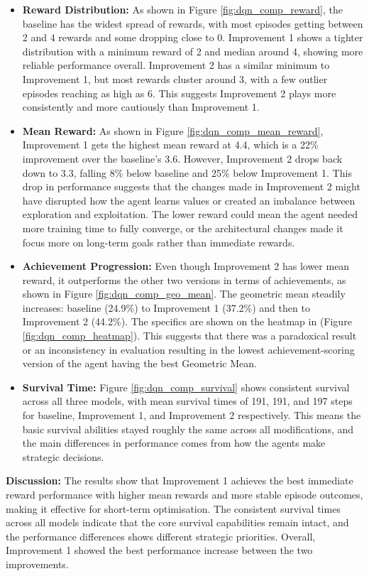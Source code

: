 \documentclass[twocolumn]{article}
\begin{document}
\begin{itemize}
	\item \textbf{Reward Distribution:} As shown in Figure \ref{fig:dqn_comp_reward}, the baseline has the widest spread of rewards, with most episodes getting between 2 and 4 rewards and some dropping close to 0. Improvement 1 shows a tighter distribution with a minimum reward of 2 and median around 4, showing more reliable performance overall. Improvement 2 has a similar minimum to Improvement 1, but most rewards cluster around 3, with a few outlier episodes reaching as high as 6. This suggests Improvement 2 plays more consistently and more cautiously than Improvement 1.
	
	\item \textbf{Mean Reward:} As shown in Figure \ref{fig:dqn_comp_mean_reward}, Improvement 1 gets the highest mean reward at 4.4, which is a 22\% improvement over the baseline's 3.6. However, Improvement 2 drops back down to 3.3, falling 8\% below baseline and 25\% below Improvement 1. This drop in performance suggests that the changes made in Improvement 2 might have disrupted how the agent learns values or created an imbalance between exploration and exploitation. The lower reward could mean the agent needed more training time to fully converge, or the architectural changes made it focus more on long-term goals rather than immediate rewards.
	
	\item \textbf{Achievement Progression:} Even though Improvement 2 has lower mean reward, it outperforms the other two versions in terms of achievements, as shown in Figure \ref{fig:dqn_comp_geo_mean}. The geometric mean steadily increases: baseline (24.9\%) to Improvement 1 (37.2\%) and then to Improvement 2 (44.2\%). The specifics are shown on the heatmap in (Figure \ref{fig:dqn_comp_heatmap}). This suggests that there was a paradoxical result or an inconsistency in evaluation resulting in the lowest achievement-scoring version of the agent having the best Geometric Mean. 
	
	\item \textbf{Survival Time:} Figure \ref{fig:dqn_comp_survival} shows consistent survival across all three models, with mean survival times of 191, 191, and 197 steps for baseline, Improvement 1, and Improvement 2 respectively. This means the basic survival abilities stayed roughly the same across all modifications, and the main differences in performance comes from how the agents make strategic decisions.
\end{itemize}
\textbf{Discussion:} The results show that Improvement 1 achieves the best immediate reward performance with higher mean rewards and more stable episode outcomes, making it effective for short-term optimisation. The consistent survival times across all models indicate that the core survival capabilities remain intact, and the performance differences shows different strategic priorities. Overall, Improvement 1 showed the best performance increase between the two improvements.
\end{document}
